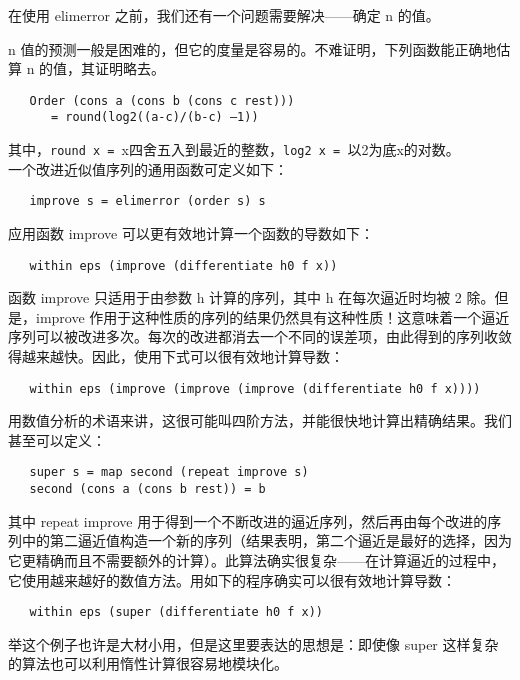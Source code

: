\documentclass[12pt,a4paper]{article}
\begin{document}
在使用 elimerror 之前，我们还有一个问题需要解决——确定 n 的值。

n 值的预测一般是困难的，但它的度量是容易的。不难证明，下列函数能正确地估算 n 的值，其证明略去。

\begin{verbatim}
   Order (cons a (cons b (cons c rest)))
      = round(log2((a-c)/(b-c) –1))
\end{verbatim}

其中，\verb"round x = "x四舍五入到最近的整数，\verb"log2 x = "以2为底x的对数。\\

一个改进近似值序列的通用函数可定义如下：

\begin{verbatim}
   improve s = elimerror (order s) s
\end{verbatim}

应用函数 improve 可以更有效地计算一个函数的导数如下：
\begin{verbatim}
   within eps (improve (differentiate h0 f x))
\end{verbatim}

函数 improve 只适用于由参数 h 计算的序列，其中 h 在每次逼近时均被 2 除。但是，improve 作用于这种性质的序列的结果仍然具有这种性质！这意味着一个逼近序列可以被改进多次。每次的改进都消去一个不同的误差项，由此得到的序列收敛得越来越快。因此，使用下式可以很有效地计算导数：

\begin{verbatim}
   within eps (improve (improve (improve (differentiate h0 f x))))
\end{verbatim}

用数值分析的术语来讲，这很可能叫四阶方法，并能很快地计算出精确结果。我们甚至可以定义：

\begin{verbatim}
   super s = map second (repeat improve s)
   second (cons a (cons b rest)) = b
\end{verbatim}

其中 repeat improve 用于得到一个不断改进的逼近序列，然后再由每个改进的序列中的第二逼近值构造一个新的序列（结果表明，第二个逼近是最好的选择，因为它更精确而且不需要额外的计算）。此算法确实很复杂——在计算逼近的过程中，它使用越来越好的数值方法。用如下的程序确实可以很有效地计算导数：

\begin{verbatim}
   within eps (super (differentiate h0 f x))
\end{verbatim}
   
举这个例子也许是大材小用，但是这里要表达的思想是：即使像 super 这样复杂的算法也可以利用惰性计算很容易地模块化。
\end{document}
